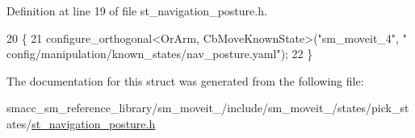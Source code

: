 Definition at line 19 of file st\+\_\+navigation\+\_\+posture.\+h.


\begin{DoxyCode}
20     \{
21         configure\_orthogonal<OrArm, CbMoveKnownState>(\textcolor{stringliteral}{"sm\_moveit\_4"}, \textcolor{stringliteral}{"
      config/manipulation/known\_states/nav\_posture.yaml"});
22     \}
\end{DoxyCode}


The documentation for this struct was generated from the following file\+:\begin{DoxyCompactItemize}
\item 
smacc\+\_\+sm\+\_\+reference\+\_\+library/sm\+\_\+moveit\+\_/include/sm\+\_\+moveit\+\_/states/pick\+\_\+states/\hyperlink{4_2include_2sm__moveit__4_2states_2pick__states_2st__navigation__posture_8h}{st\+\_\+navigation\+\_\+posture.\+h}\end{DoxyCompactItemize}
